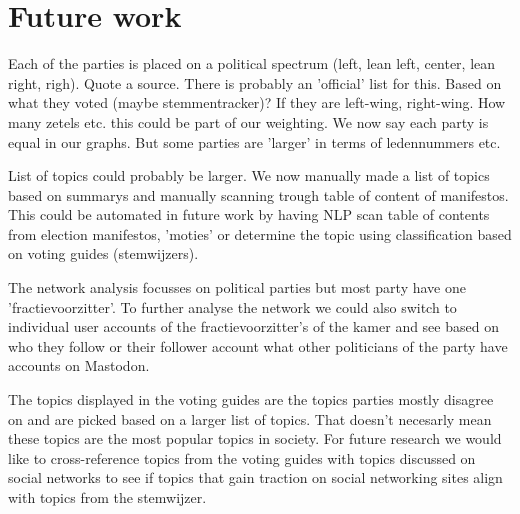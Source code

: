\section{Future work}

Each of the parties is placed on a political spectrum (left, lean left, center, lean right, righ). Quote a source. There is probably an 'official' list for this. Based on what they voted (maybe stemmentracker)? If they are left-wing, right-wing. How many zetels etc. this could be part of our weighting. We now say each party is equal in our graphs. But some parties are 'larger' in terms of ledennummers etc.

List of topics could probably be larger. We now manually made a list of topics based on summarys and manually scanning trough table of content of manifestos. This could be automated in future work by having NLP scan table of contents from election manifestos, 'moties' or determine the topic using classification based on voting guides (stemwijzers).

The network analysis focusses on political parties but most party have one 'fractievoorzitter'. To further analyse the network we could also switch to individual user accounts of the fractievoorzitter's of the kamer and see based on who they follow or their follower account what other politicians of the party have accounts on Mastodon.

The topics displayed in the voting guides are the topics parties mostly disagree on and are picked based on a larger list of topics. That doesn't necesarly mean these topics are the most popular topics in society. For future research we would like to cross-reference topics from the voting guides with topics discussed on social networks to see if topics that gain traction on social networking sites align with topics from the stemwijzer.
